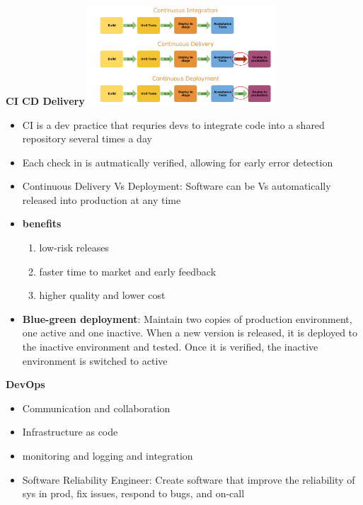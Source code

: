 \documentclass[10pt, landscape]{article}
\begin{document}
\begin{multicols}{4}
\textbf{CI CD Delivery}
\includegraphics*[width=7cm]{ci_cd}
\begin{itemize}
  \item CI is a dev practice that requries  devs to integrate code into a shared repository several times a day
  \item Each check in is autmatically verified, allowing for early error detection
  \item Continuous Delivery Vs Deployment: Software can be Vs automatically released into production at any time
  \item \textbf{benefits}
  \begin{enumerate}
    \item low-risk releases
    \item faster time to market and early feedback 
    \item higher quality and lower cost
  \end{enumerate}
  \item \textbf{Blue-green deployment}: Maintain two copies of production environment, one active and one inactive. When a new version is released, it is deployed to the inactive environment and tested. Once it is verified, the inactive environment is switched to active
\end{itemize}


\textbf{DevOps}
\begin{itemize}
  \item Communication and collaboration 
  \item Infrastructure as code 
  \item monitoring and logging and integration
  \item Software Reliability Engineer: Create software that improve the reliability of sys in prod, fix issues, respond to bugs, and on-call
\end{itemize}


\end{multicols}
\end{document}
